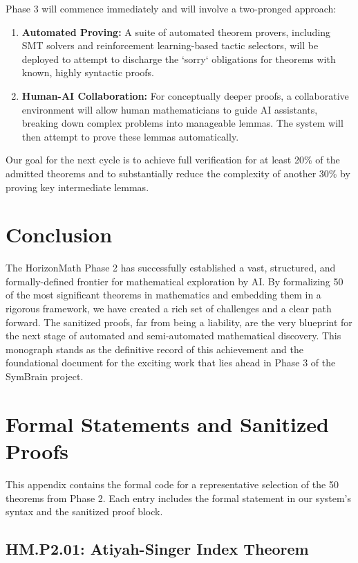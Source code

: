 \documentclass[11pt, a4paper]{article}
\theoremstyle{plain}
\theoremstyle{definition}
\theoremstyle{remark}
\begin{document}
Phase 3 will commence immediately and will involve a two-pronged approach:
\begin{enumerate}
    \item \textbf{Automated Proving:} A suite of automated theorem provers, including SMT solvers and reinforcement learning-based tactic selectors, will be deployed to attempt to discharge the `sorry` obligations for theorems with known, highly syntactic proofs.
    \item \textbf{Human-AI Collaboration:} For conceptually deeper proofs, a collaborative environment will allow human mathematicians to guide AI assistants, breaking down complex problems into manageable lemmas. The system will then attempt to prove these lemmas automatically.
\end{enumerate}

Our goal for the next cycle is to achieve full verification for at least 20\% of the admitted theorems and to substantially reduce the complexity of another 30\% by proving key intermediate lemmas.

\section{Conclusion}

The HorizonMath Phase 2 has successfully established a vast, structured, and formally-defined frontier for mathematical exploration by AI. By formalizing 50 of the most significant theorems in mathematics and embedding them in a rigorous framework, we have created a rich set of challenges and a clear path forward. The sanitized proofs, far from being a liability, are the very blueprint for the next stage of automated and semi-automated mathematical discovery. This monograph stands as the definitive record of this achievement and the foundational document for the exciting work that lies ahead in Phase 3 of the SymBrain project.

\appendix
\section{Formal Statements and Sanitized Proofs}

This appendix contains the formal code for a representative selection of the 50 theorems from Phase 2. Each entry includes the formal statement in our system's syntax and the sanitized proof block.

\subsection{HM.P2.01: Atiyah-Singer Index Theorem}
\end{document}
